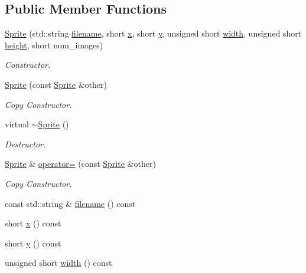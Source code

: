 \subsection*{Public Member Functions}
\begin{DoxyCompactItemize}
\item 
\hyperlink{classSprite_a848f031c098042b68984b3840ce64604}{Sprite} (std\-::string \hyperlink{classSprite_aae3514a9a1f77ab5e8e213e44ec618a3}{filename}, short \hyperlink{classSprite_a18eb1c5b90418641d3eabda8f7fe56c9}{x}, short \hyperlink{classSprite_afca2c03aad9d2526427470688ae76439}{y}, unsigned short \hyperlink{classSprite_ac56c9242f797a1a2f76687fca636a3c4}{width}, unsigned short \hyperlink{classSprite_ae96d42c46af7aad1f9031da62f878b21}{height}, short num\-\_\-images)
\begin{DoxyCompactList}\small\item\em Constructor. \end{DoxyCompactList}\item 
\hyperlink{classSprite_ac17f0e18a22c84234a659b1c0bbb69de}{Sprite} (const \hyperlink{classSprite}{Sprite} \&other)
\begin{DoxyCompactList}\small\item\em Copy Constructor. \end{DoxyCompactList}\item 
virtual \hyperlink{classSprite_a8accab430f9d90ae5117b57d67e32b84}{$\sim$\-Sprite} ()
\begin{DoxyCompactList}\small\item\em Destructor. \end{DoxyCompactList}\item 
\hyperlink{classSprite}{Sprite} \& \hyperlink{classSprite_abb3f0673884d42b6b116f0c4d1a47b77}{operator=} (const \hyperlink{classSprite}{Sprite} \&other)
\begin{DoxyCompactList}\small\item\em Copy Constructor. \end{DoxyCompactList}\item 
const std\-::string \& \hyperlink{classSprite_aae3514a9a1f77ab5e8e213e44ec618a3}{filename} () const 
\item 
short \hyperlink{classSprite_a18eb1c5b90418641d3eabda8f7fe56c9}{x} () const 
\item 
short \hyperlink{classSprite_afca2c03aad9d2526427470688ae76439}{y} () const 
\item 
unsigned short \hyperlink{classSprite_ac56c9242f797a1a2f76687fca636a3c4}{width} () const 
\item 

\end{DoxyCompactItemize}
